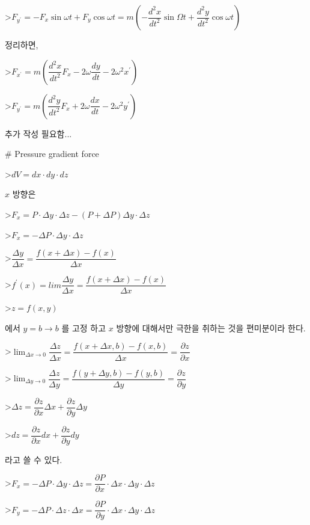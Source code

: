>$ F_{y^{\prime}} = -F_{x} \sin \omega t + F_{y} \cos \omega t
= m \left ( - \dfrac{d^{2}x}{dt^{2}} \sin \Omega t + \dfrac{d^{2}y}{dt^{2}} \cos \omega t \right) $

정리하면,

>$ F_{x^{\prime}} = m \left( \dfrac{d^{2}x}{dt^{2}}F_{x} - 2 \omega  \dfrac{dy}{dt} - 2 \omega^{2} x^{\prime}  \right) $

>$ F_{y^{\prime}} = m \left( \dfrac{d^{2}y}{dt^{2}}F_{x} + 2 \omega  \dfrac{dx}{dt} - 2 \omega^{2} y^{\prime}  \right) $

추가 작성 필요함...


# Pressure gradient force

>$ dV = dx \cdot dy \cdot dz $


$x$ 방향은

>$ F_{x} = P \cdot \Delta y \cdot \Delta z - \left( P + \Delta P \right) \Delta y \cdot \Delta z$

>$ F_{x} = - \Delta P \cdot \Delta y \cdot \Delta z $

>$ \dfrac { \Delta y}{\Delta x } = \dfrac {f\left(x + \Delta x \right) - f\left(x \right)}{ \Delta x}$

>$f^{\prime} \left(x \right) = lim \dfrac { \Delta y}{\Delta x } 
= \dfrac {f\left(x + \Delta x \right) - f\left(x \right)}{ \Delta x}$


>$z = f \left( x, y \right) $ 

에서 $y = b \rightarrow b$ 를 고정 하고 $x$ 방향에 대해서만 극한을 취하는 것을 편미분이라 한다.

>$ \displaystyle \lim_{\Delta x \rightarrow 0} \dfrac { \Delta z}{\Delta x } 
= \dfrac {f\left(x + \Delta x, b \right) - f\left(x, b \right)}{ \Delta x} = \dfrac{\partial z}{\partial x} $

>$\displaystyle \lim_{\Delta y \rightarrow 0} \dfrac { \Delta z}{\Delta y } 
= \dfrac {f\left(y + \Delta y, b \right) - f\left(y, b \right)}{ \Delta y} = \dfrac{\partial z}{\partial y} $

>$ \Delta z = \dfrac{\partial z}{\partial x} \Delta x + \dfrac{\partial z}{\partial y} \Delta y $

>$ dz = \dfrac{\partial z}{\partial x} dx + \dfrac{\partial z}{\partial y} dy $

라고 쓸 수 있다.

>$ F_{x} = - \Delta P \cdot \Delta y \cdot \Delta z 
= \dfrac{\partial P}{\partial x} \cdot \Delta x \cdot \Delta y \cdot \Delta z $

>$ F_{y} = - \Delta P \cdot \Delta z \cdot \Delta x 
= \dfrac{\partial P}{\partial y} \cdot \Delta x \cdot \Delta y \cdot \Delta z $

